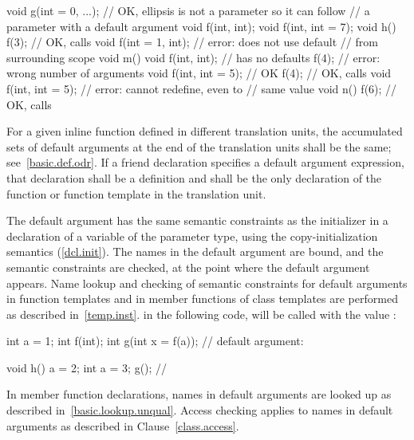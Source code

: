 \begin{codeblock}
void g(int = 0, ...);           // OK, ellipsis is not a parameter so it can follow
                                // a parameter with a default argument
void f(int, int);
void f(int, int = 7);
void h() {
  f(3);                         // OK, calls 
  void f(int = 1, int);         // error: does not use default
                                // from surrounding scope
}
void m() {
  void f(int, int);             // has no defaults
  f(4);                         // error: wrong number of arguments
  void f(int, int = 5);         // OK
  f(4);                         // OK, calls 
  void f(int, int = 5);         // error: cannot redefine, even to
                                // same value
}
void n() {
  f(6);                         // OK, calls 
}
\end{codeblock}
\exitexample
For a given inline function defined in different translation units,
the accumulated sets of default arguments at the end of the
translation units shall be the same;
see~\ref{basic.def.odr}.
If a friend declaration specifies a default argument expression,
that declaration shall be a definition and shall be the only
declaration of the function or function template in the translation unit.

\pnum
{}%
%
%
The default argument has the
same semantic constraints as the initializer in a
declaration of a variable of the parameter type, using the
copy-initialization semantics (\ref{dcl.init}).
The names in the
default argument are bound, and the semantic constraints are checked,
at the point where the default argument appears.
Name lookup and checking of semantic constraints for default
arguments in function templates and in member functions of
class templates are performed as described in~\ref{temp.inst}.
\enterexample
in the following code,
%
will be called with the value
:

\begin{codeblock}
int a = 1;
int f(int);
int g(int x = f(a));            // default argument: 

void h() {
  a = 2;
  {
  int a = 3;
  g();                          // 
  }
}
\end{codeblock}
\exitexample
\enternote
In member function declarations,
names in default arguments are looked up
as described in~\ref{basic.lookup.unqual}.
Access checking applies to names in default arguments as
described in Clause~\ref{class.access}.
\exitnote

